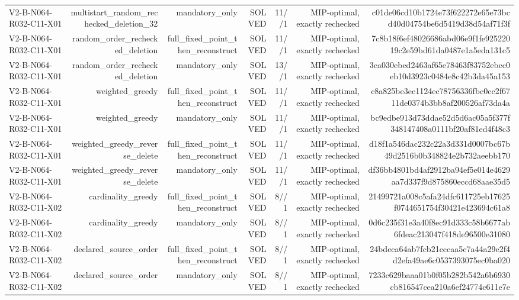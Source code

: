 {\begin{longtable}{lrrrrrr}
V2-B-N064-R032-C11-X01 & multistart\_random\_rechecked\_deletion\_32 & mandatory\_only & SOLVED & 11//1 & MIP-optimal, exactly rechecked & c01de06cd10b1724e73f622272e65e73bcd40d04754be6d5419d38d54af71f3f \\
V2-B-N064-R032-C11-X01 & random\_order\_rechecked\_deletion & full\_fixed\_point\_then\_reconstruct & SOLVED & 11//1 & MIP-optimal, exactly rechecked & 7c8b18f6ef48026686abd06e9f1fe92522019c2e59bd61da0487e1a5eda131c5 \\
V2-B-N064-R032-C11-X01 & random\_order\_rechecked\_deletion & mandatory\_only & SOLVED & 13//1 & MIP-optimal, exactly rechecked & 3ca030ebed2463af65e78463f83752ebcc0eb10d3923c0484e8c42b3da45a153 \\
V2-B-N064-R032-C11-X01 & weighted\_greedy & full\_fixed\_point\_then\_reconstruct & SOLVED & 11//1 & MIP-optimal, exactly rechecked & c8a825be3ec1124ec78756336fbc0cc2f6711de0374b3bb8af200526af73da4a \\
V2-B-N064-R032-C11-X01 & weighted\_greedy & mandatory\_only & SOLVED & 11//1 & MIP-optimal, exactly rechecked & bc9edbe913d73ddae52d5d6ac05a5f377f348147408a0111bf20af81ed4f48c3 \\
V2-B-N064-R032-C11-X01 & weighted\_greedy\_reverse\_delete & full\_fixed\_point\_then\_reconstruct & SOLVED & 11//1 & MIP-optimal, exactly rechecked & d18f1a546dac232c22a3d331d0007bc67b49d2516b0b348824e2b732aeebb170 \\
V2-B-N064-R032-C11-X01 & weighted\_greedy\_reverse\_delete & mandatory\_only & SOLVED & 11//1 & MIP-optimal, exactly rechecked & df36bb4801bd4af2912ba94ef5e014e4629aa7d337f9d875860eccd68aae35d5 \\
V2-B-N064-R032-C11-X02 & cardinality\_greedy & full\_fixed\_point\_then\_reconstruct & SOLVED & 8//1 & MIP-optimal, exactly rechecked & 21499721a008c5afa24dfc611725eb17625f0744651754f30421e423694c61a8 \\
V2-B-N064-R032-C11-X02 & cardinality\_greedy & mandatory\_only & SOLVED & 8//1 & MIP-optimal, exactly rechecked & 0d6c235f31e3a40f8ec91d333c58b6677ab6fdeac213047f418de96500e31080 \\
V2-B-N064-R032-C11-X02 & declared\_source\_order & full\_fixed\_point\_then\_reconstruct & SOLVED & 8//1 & MIP-optimal, exactly rechecked & 24bdeca64ab7fcb21eccaa5c7a44a29e2f4d2efa49ae6c0537393075ec0ba020 \\
V2-B-N064-R032-C11-X02 & declared\_source\_order & mandatory\_only & SOLVED & 8//1 & MIP-optimal, exactly rechecked & 7233c629baaa01b0f05b282b542a6b6930cb816547cea210a6ef24774c611e7e \\

\end{longtable}}
